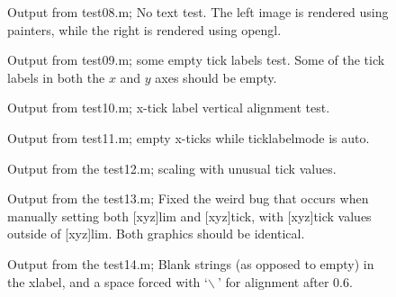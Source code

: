 \documentclass[a4paper,11pt]{article}
\begin{document}
     \begin{figure}[ht]
       \centering
       \quad
       \caption{Output from {\ttfamily test08.m}; No text test. The left image is rendered using
       painters, while the right is rendered using opengl.}
     \end{figure}
     \begin{figure}
       \centering
       \caption{Output from {\ttfamily test09.m}; some empty tick labels test. Some of the tick labels
       in both the $x$ and $y$ axes should be empty.}
     \end{figure}
     \begin{figure}
       \centering
       \caption{Output from {\ttfamily test10.m}; x-tick label vertical alignment test.}
     \end{figure}
     \begin{figure}
       \centering
       \caption{Output from {\ttfamily test11.m}; empty x-ticks while {\ttfamily ticklabelmode}
       is {\ttfamily auto}.}
     \end{figure}
     \begin{figure}[ht]
       \centering
       \caption{Output from the {\ttfamily test12.m}; scaling with unusual tick values.}
     \end{figure}
     \begin{figure}[ht]
       \centering
       \quad
       \caption{Output from the {\ttfamily test13.m}; Fixed the weird bug that occurs when
         manually setting both [xyz]lim and [xyz]tick, with [xyz]tick values outside of [xyz]lim.
         Both graphics should be identical.}
     \end{figure}
     \begin{figure}[ht]
       \centering
       \caption{Output from the {\ttfamily test14.m}; Blank strings (as opposed to empty) in the
         xlabel, and a space forced with {\ttfamily `$\backslash~$'} for alignment after $0.6$.}
     \end{figure}
\end{document}
